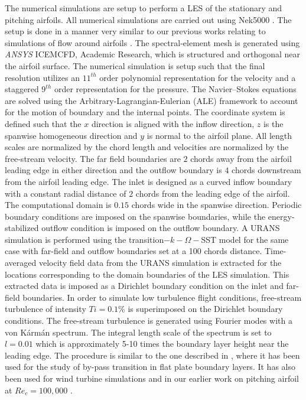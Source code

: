 The numerical simulations are setup to perform a LES of the stationary and pitching airfoils.
All numerical simulations are carried out using Nek5000 \citep{nek5000}. The setup is done in a manner very similar to our previous works relating to simulations of flow around airfoils \citep{hosseini16,proc-tsfp10-vinuesa,proc-tsfp10-negi}. The spectral-element mesh is generated using \textit{ANSYS}\textsuperscript{\textregistered} ICEMCFD, Academic Research, which is structured and orthogonal near the airfoil surface. The numerical simulation is setup such that the final resolution utilizes an $11^{th}$ order polynomial representation for the velocity and a staggered $9^{th}$ order representation for the pressure. The Navier--Stokes equations are solved using the Arbitrary-Lagrangian-Eulerian (ALE) framework \citep{ho90,ho91} to account for the motion of boundary and the internal points. The coordinate system is defined such that the $x$ direction is aligned with the inflow direction, $z$ is the spanwise homogeneous direction and $y$ is normal to the airfoil plane. All length scales are normalized by the chord length and velocities are normalized by the free-stream velocity. The far field boundaries are $2$ chords away from the airfoil leading edge in either direction and the outflow boundary is $4$ chords downstream from the airfoil leading edge. The inlet is designed as a curved inflow boundary with a constant radial distance of $2$ chords from the leading edge of the airfoil. The computational domain is $0.15$ chords wide in the spanwise direction. Periodic boundary conditions are imposed on the spanwise boundaries, while the energy-stabilized outflow condition \citep{dong2014} is imposed on the outflow boundary. A URANS simulation is performed using the transition$-k-\Omega-$SST model for the same case with far-field and outflow boundaries set at a 100 chords distance. Time-averaged velocity field data from the URANS simulation is extracted for the locations corresponding to the domain boundaries of the LES simulation. This extracted data is imposed as a Dirichlet boundary condition on the inlet and far-field boundaries. In order to simulate low turbulence flight conditions, free-stream turbulence of intensity $Ti=0.1\%$ is superimposed on the Dirichlet boundary conditions. The free-stream turbulence is generated using Fourier modes with a von K\'arm\'an spectrum. The integral length scale of the spectrum is set to $l=0.01$ which is approximately 5-10 times the boundary layer height near the leading edge. The procedure is similar to the one described in \cite{schlatterdiploma,brandt04,schlatter08}, where it has been used for the study of by-pass transition in flat plate boundary layers. It has also been used for wind turbine simulations \citep{kleusberglicenciate} and in our earlier work on pitching airfoil at $Re_{c}=100,000$ \citep{proc-tsfp10-negi}.

